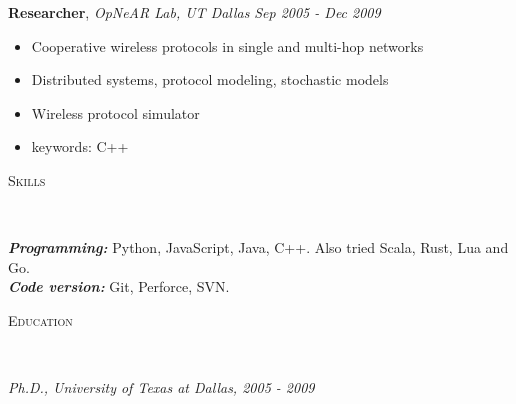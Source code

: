 \documentclass[9pt]{article}
\newenvironment{changemargin}[2]{%
  \begin{list}{}{%
    \setlength{\topsep}{0pt}%
    \setlength{\leftmargin}{#1}%
    \setlength{\rightmargin}{#2}%
    \setlength{\listparindent}{\parindent}%
    \setlength{\itemindent}{\parindent}%
    \setlength{\parsep}{\parskip}%
  }%
  \item[]}{\end{list}
}
\newcommand{\lineover}{
	\begin{changemargin}{-0.05in}{-0.05in}
		\vspace*{-8pt}
		\hrulefill \\
		\vspace*{-2pt}
	\end{changemargin}
}
\newcommand{\header}[1]{
	\begin{changemargin}{-0.5in}{-0.5in}
		\scshape{#1}\\
  	\lineover
	\end{changemargin}
}
\newenvironment{body} {
	\vspace*{-16pt}
	\begin{changemargin}{-0.25in}{-0.5in}
  }
	{\end{changemargin}
}
\begin{document}
\begin{body}
  \textbf {Researcher}, \emph{OpNeAR Lab, UT Dallas} \hfill \emph{Sep 2005 - Dec 2009}\\
  \vspace*{-4pt}
  \begin{itemize} \itemsep -0pt
    \item Cooperative wireless protocols in single and multi-hop networks
    \item Distributed systems, protocol modeling, stochastic models
    \item Wireless protocol simulator
    \item keywords: C++
  \end{itemize}

\end{body}

\smallskip


\header{Skills}

\begin{body}
	\vspace{14pt}
	\emph{\textbf{Programming:}}{} Python, JavaScript, Java, C++. Also tried Scala, Rust, Lua and Go.\\
  \emph{\textbf{Code version:}}{} Git, Perforce, SVN.\\
\end{body}

\header{Education}

\begin{body}
    \vspace{14pt}
    \emph{Ph.D., University of Texas at Dallas, 2005 - 2009}
\end{body}

\smallskip
\end{document}
